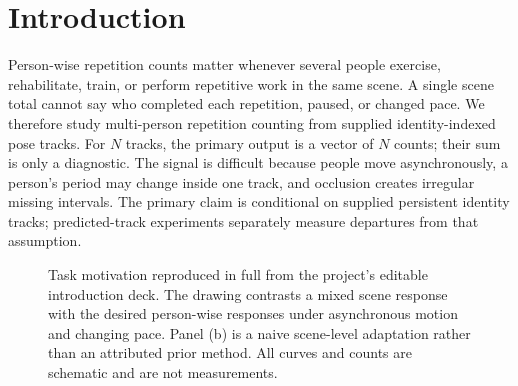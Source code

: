\section{Introduction}
\label{sec:introduction}

Person-wise repetition counts matter whenever several people exercise,
rehabilitate, train, or perform repetitive work in the same scene. A single
scene total cannot say who completed each repetition, paused, or changed pace.
We therefore study multi-person repetition counting from supplied
identity-indexed pose tracks. For $N$ tracks, the primary output is a vector
of $N$ counts; their sum is only a diagnostic. The signal is difficult because
people move asynchronously, a person's period may change inside one track, and
occlusion creates irregular missing intervals.
The primary claim is conditional on supplied persistent identity tracks;
predicted-track experiments separately measure departures from that assumption.

\begin{figure}[t]
  \centering
  \TaskMotivationGraphic
  \caption{Task motivation reproduced in full from the project's editable
  introduction deck. The drawing contrasts a mixed scene response with the
  desired person-wise responses under asynchronous motion and changing pace.
  Panel (b) is a naive scene-level adaptation rather than an attributed prior
  method. All curves and counts are schematic and are not measurements.}
  \label{fig:task-motivation}
\end{figure}

